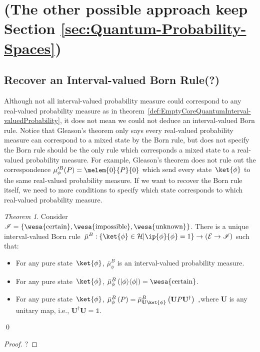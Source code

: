 \documentclass{article}
\theoremstyle{remark}
\newtheorem{thm}{Theorem}
\newcommand{\events}{\ensuremath{\mathcal{E}}}
\newcommand{\Hilb}{\mathcal{H}}
\newcommand{\proj}[1]{|#1 \rangle\langle #1 |}
\newcommand{\imposs}{{\mbox{\wesa{impossible}}}}
\newcommand{\necess}{{\mbox{\wesa{certain}}}}
\newcommand{\unknown}{{\mbox{\wesa{unknown}}}}
\begin{document}
\section{(The other possible approach keep Section \ref{sec:Quantum-Probability-Spaces}) }



\subsection{Recover an Interval-valued Born Rule(?)}

Although not all interval-valued probability measure could correspond
to any real-valued probability measure as in theorem~\ref{def:EmptyCoreQuantumInterval-valuedProbability},
it does not mean we could not deduce an interval-valued Born rule.
Notice that Gleason's theorem only says every real-valued probability
measure can correspond to a mixed state by the Born rule, but does
not specify the Born rule should be the only rule which corresponds
a mixed state to a real-valued probability measure. For example, Gleason's
theorem does not rule out the correspondence $\mu_{\phi}^{\prime B}(P)=\melem{0}{P}{0}$
which send every state~$\ket{\phi}$ to the same real-valued probability
measure. If we want to recover the Born rule itself, we need to more
conditions to specify which state corresponds to which real-valued
probability measure.

\begin{thm}Consider\emph{ }$\mathscr{I}=\left\{ \necess,\imposs,\unknown\right\} $.
There is a unique interval-valued Born rule~$\bar{\mu}^{B}:\left\{ \ket{\phi}\in\Hilb\middle|\ip{\phi}{\phi}=1\right\} \rightarrow\left(\events\rightarrow\mathscr{I}\right)$
such that:
\begin{itemize}
\item For any pure state~$\ket{\phi}$, $\bar{\mu}_{\phi}^{B}$ is an interval-valued
probability measure.
\item For any pure state~$\ket{\phi}$, $\bar{\mu}_{\phi}^{B}\left(\proj{\phi}\right)=\necess$.
\item For any pure state~$\ket{\phi}$, $\bar{\mu}_{\phi}^{B}\left(P\right)=\bar{\mu}_{\mathbf{U}\ket{\phi}}^{B}\left(\mathbf{U}P\mathbf{U}^{\dagger}\right)\textrm{ ,}$where
$\mathbf{U}$ is any unitary map, i.e., $\mathbf{U}^{\dagger}\mathbf{U}=\mathbb{1}$. 
\end{itemize}
\qed\end{thm}
\begin{proof}
? 
\end{proof}
\end{document}
